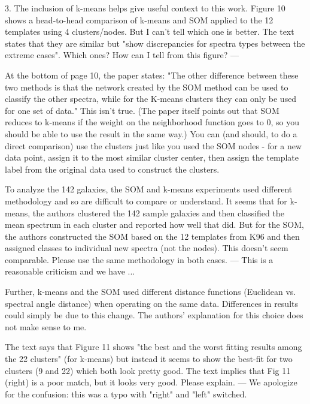 3. The inclusion of k-means helps give useful context to this work. Figure 10 shows a head-to-head comparison of k-means and SOM applied to the 12 templates using 4 clusters/nodes.  But I can't tell which one is better.  The text states that they are similar but "show discrepancies for spectra types between the extreme cases".  Which ones?  How can I tell from this figure?
--- %

At the bottom of page 10, the paper states: "The other difference between these two methods is that the network created by the SOM method can be used to classify the other spectra, while for the K-means clusters they can only be used for one set of data."  This isn't true.  (The paper itself points out that SOM reduces to k-means if the weight on the neighborhood function goes to 0, so you should be able to use the result in the same way.)  You can (and should, to do a direct comparison) use the clusters just like you used the SOM nodes - for a new data point, assign it to the most similar cluster center, then assign the template label from the original data used to construct the clusters.

To analyze the 142 galaxies, the SOM and k-means experiments used different methodology and so are difficult to compare or understand. It seems that for k-means, the authors clustered the 142 sample galaxies and then classified the mean spectrum in each cluster and reported how well that did.  But for the SOM, the authors constructed the SOM based on the 12 templates from K96 and then assigned classes to individual new spectra (not the nodes).  This doesn't seem comparable.  Please use the same methodology in both cases.
--- This is a reasonable criticism and we have ... 


Further, k-means and the SOM used different distance functions (Euclidean vs. spectral angle distance) when operating on the same data.  Differences in results could simply be due to this change.  The authors' explanation for this choice does not make sense to me.


The text says that Figure 11 shows "the best and the worst fitting results among the 22 clusters" (for k-means) but instead it seems to show the best-fit for two clusters (9 and 22) which both look pretty good.  The text implies that Fig 11 (right) is a poor match, but it looks very good.  Please explain.
--- We apologize for the confusion: this was a typo with "right" and "left" switched.


